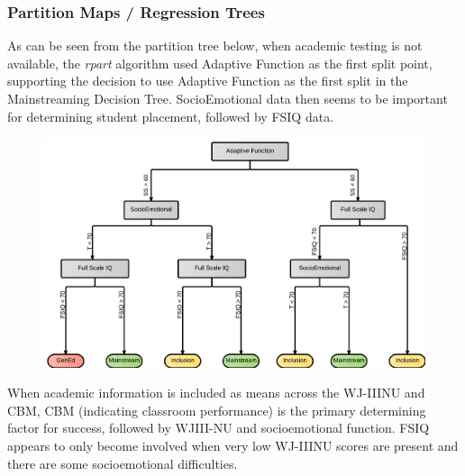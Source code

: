 \documentclass[twoside]{article}
\begin{document}
\subsubsection{Partition Maps  / Regression Trees}
%
As can be seen from the partition tree below, when academic testing is not available, the \textit{rpart} algorithm used Adaptive Function as the first split point, supporting the decision to use Adaptive Function as the first split in the Mainstreaming Decision Tree. SocioEmotional data then seems to be important for determining student placement, followed by FSIQ data.
%
%
%
%
\begin{figure}[htp!]
	\centering
	\includegraphics[width=\textwidth]{RegressionTree_NOAcademics.png}
	\caption[Mainstreaming Decision Tree]{\textit{           }}
	\label{fig4}
\end{figure}
%
%
%
%
When academic information is included as means across the WJ-IIINU and CBM, CBM (indicating classroom performance) is the primary determining factor for success, followed by WJIII-NU and socioemotional function. FSIQ appears to only become involved when very low WJ-IIINU scores are present and there are some socioemotional difficulties.
\end{document}
